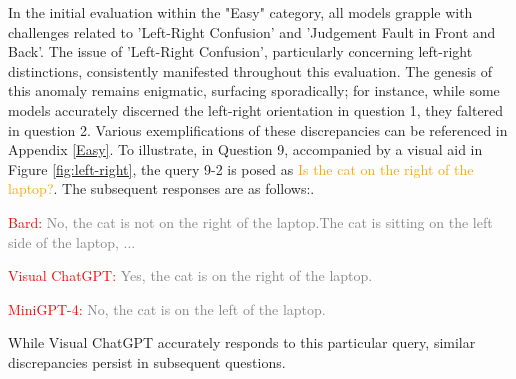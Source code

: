 \documentclass[twocolumn,11pt]{report}
\begin{document}
In the initial evaluation within the "Easy" category, all models grapple with challenges related to 'Left-Right Confusion' and 'Judgement Fault in Front and Back'. The issue of 'Left-Right Confusion', particularly concerning left-right distinctions, consistently manifested throughout this evaluation. The genesis of this anomaly remains enigmatic, surfacing sporadically; for instance, while some models accurately discerned the left-right orientation in question 1, they faltered in question 2. Various exemplifications of these discrepancies can be referenced in Appendix \ref{Easy}. To illustrate, in Question 9, accompanied by a visual aid in Figure \ref{fig:left-right}, the query 9-2 is posed as \textcolor{orange}{Is the cat on the right of the laptop?}. The subsequent responses are as follows:.

\textcolor{red}{Bard:} \textcolor{gray}{No, the cat is not on the right of the laptop.The cat is sitting on the left side of the laptop, ...}

\textcolor{red}{Visual ChatGPT:} \textcolor{gray}{Yes, the cat is on the right of the laptop.}

\textcolor{red}{MiniGPT-4:} \textcolor{gray}{No, the cat is on the left of the laptop.}

While Visual ChatGPT accurately responds to this particular query, similar discrepancies persist in subsequent questions.
\end{document}
